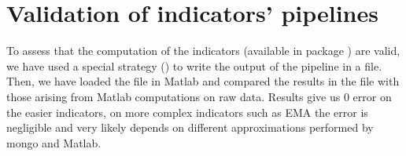 \section{Validation of indicators' pipelines}\label{sec:indicatorsvalidation}

To assess that the computation of the indicators (available in package
) are valid, we have used a
special strategy () to write the output of the
pipeline in a file. Then, we have loaded the file in Matlab and compared the
results in the file with those arising from Matlab computations on raw data. Results
give us 0 error on the easier indicators, on more complex indicators such as EMA
the error is negligible and very likely depends on different approximations
performed by mongo and Matlab.
